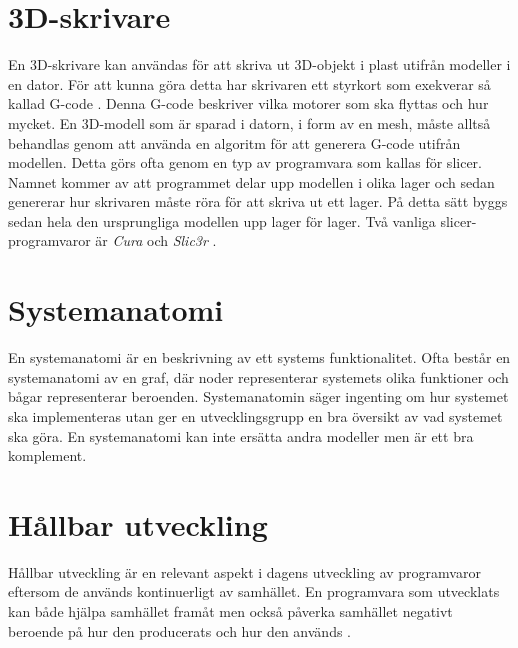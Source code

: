 \section{3D-skrivare}
En 3D-skrivare kan användas för att skriva ut 3D-objekt i plast utifrån modeller i en dator. För att kunna göra detta har skrivaren ett styrkort som exekverar så kallad G-code \cite{gcode}. Denna G-code beskriver vilka motorer som ska flyttas och hur mycket. En 3D-modell som är sparad i datorn, i form av en mesh, måste alltså behandlas genom att använda en algoritm för att generera G-code utifrån modellen. Detta görs ofta genom en typ av programvara som kallas för slicer. Namnet kommer av att programmet delar upp modellen i olika lager och sedan genererar hur skrivaren måste röra för att skriva ut ett lager. På detta sätt byggs sedan hela den ursprungliga modellen upp lager för lager. Två vanliga slicer-programvaror är \textit{Cura} \cite{cura} och \textit{Slic3r} \cite{slic3r}.

\section{Systemanatomi}
En systemanatomi är en beskrivning av ett systems funktionalitet. Ofta består en systemanatomi av en graf, där noder representerar systemets olika funktioner och bågar representerar beroenden. Systemanatomin säger ingenting om hur systemet ska implementeras utan ger en utvecklingsgrupp en bra översikt av vad systemet ska göra. En systemanatomi kan inte ersätta andra modeller men är ett bra komplement.  




\section{Hållbar utveckling}

Hållbar utveckling är en relevant aspekt i dagens utveckling av programvaror eftersom de används kontinuerligt av samhället. En programvara som utvecklats kan både hjälpa samhället framåt men också påverka samhället negativt beroende på hur den producerats och hur den används \cite{raturi2014developing}.

